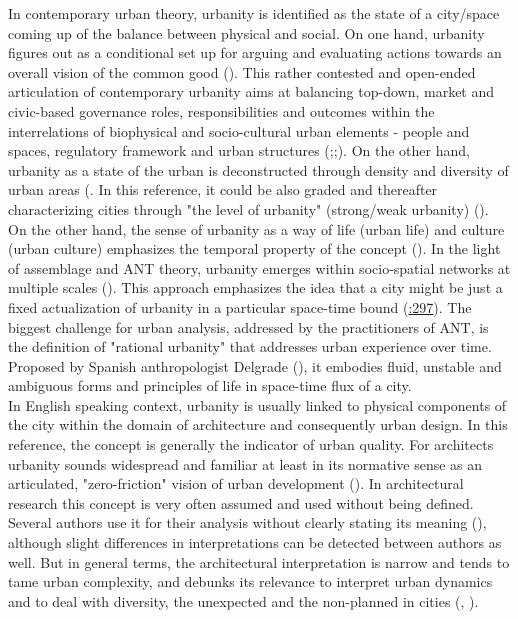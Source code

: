 \documentclass[11pt]{report}
\begin{document}
In contemporary urban theory, urbanity is identified as the state of a city/space coming up of the balance between physical and social.
On one hand, urbanity figures out as a conditional set up for arguing and evaluating actions towards an overall vision of the common good (\href{Holden}{\citealt{holden_justifying_2015}}).
This rather contested and open-ended articulation of contemporary urbanity aims at balancing top-down, market and civic-based governance roles, responsibilities and outcomes within the interrelations of biophysical and socio-cultural urban elements - people and spaces, regulatory framework and urban structures (\href{Groth}{\citealt{groth_reclaiming_2005}};\href{Tardin}{\citealt{tardin_landscape_2014}};\href{Holden}{\citealt{holden_justifying_2015}}).
On the other hand, urbanity as a state of the urban is deconstructed through density and diversity of urban areas (\citealt{Lévy's (1997, 2003)}. In this reference, it could be also graded and thereafter characterizing cities through "the level of urbanity" (strong/weak urbanity) (\cite{Lévy 2013}).
\\

On the other hand, the sense of urbanity as a way of life (urban life) and culture (urban culture) emphasizes the temporal property of the concept (\href{Farias}{\citealt{farias_introduction:_2011}}).
In the light of assemblage and ANT theory, urbanity emerges within socio-spatial networks at multiple scales (\href{Kamalipour}{\citealt{kamalipour_assemblage_2015}}).
This approach emphasizes the idea that a city might be just a fixed actualization of urbanity in a particular space-time bound (\href{Farias}{\citealt{farias_introduction:_2011}:297}).
The biggest challenge for urban analysis, addressed by the practitioners of ANT, is the definition of "rational urbanity" that addresses urban experience over time.
Proposed by Spanish anthropologist Delgrade (\citealt{(Farias and Bender p211)}), it embodies fluid, unstable and ambiguous forms and principles of life in space-time flux of a city.
\\

In English speaking context, urbanity is usually linked to physical components of the city within the domain of architecture and consequently urban design.
In this reference, the concept is generally the indicator of urban quality. For architects urbanity sounds widespread and familiar at least in its normative sense as an articulated, "zero-friction" vision of urban development (\citealt{Hajer 1999, Wüst 2005}).
In architectural research this concept is very often assumed and used without being defined.
Several authors use it for their analysis without clearly stating its meaning (\cite{(ref?????)}), although slight differences in interpretations can be detected between authors as well.
But in general terms, the architectural interpretation is narrow and tends to tame urban complexity, and debunks its relevance to interpret urban dynamics  and to deal with diversity, the unexpected and the non-planned in cities (\href{Groth}{\citealt{groth_reclaiming_2005}}, \href{Wuest}{\citealt{wust_urbanity_2005}}). 
\\
\end{document}
